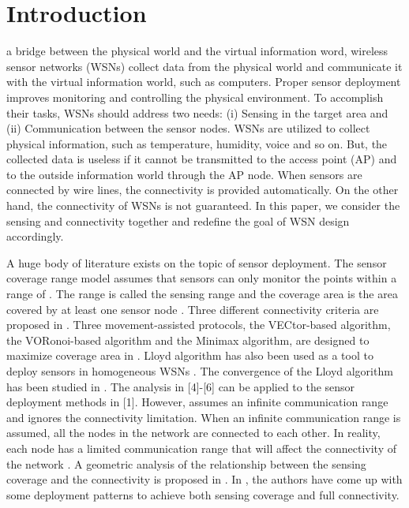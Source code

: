 \documentclass[journal,draftcls,onecolumn,12pt,twoside, narroweqnarray]{IEEEtran}
\begin{document}
\IEEEpeerreviewmaketitle



\section{Introduction}
 a bridge between the physical world and the virtual information word, wireless sensor networks (WSNs) collect data from the physical world and communicate it with the virtual information world, such as computers. Proper sensor deployment improves monitoring and controlling the physical environment.
To accomplish their tasks, WSNs should address two needs: (i) Sensing in the target area and (ii) Communication between the sensor nodes.
WSNs are utilized to collect physical information, such as temperature, humidity, voice and so on. But, the collected data is useless if it cannot be transmitted to the access point (AP) and to the outside information world through the AP node. When sensors are connected by wire lines, the  connectivity is provided automatically.
On the other hand, the connectivity of WSNs is not guaranteed. In this paper, we consider the sensing and connectivity together and redefine the goal of WSN design accordingly.

A huge body of literature exists on the topic of sensor deployment. The sensor coverage range model assumes that sensors can only monitor the points within a range of . The range  is called the sensing range and the coverage area is the area covered by at least one sensor node \cite{SD}. Three different connectivity criteria are proposed in \cite{CC}. Three movement-assisted protocols, the VECtor-based algorithm, the VORonoi-based algorithm and the Minimax algorithm, are designed to maximize coverage area in \cite{wang1}. Lloyd algorithm has also been used as a tool to deploy sensors in homogeneous WSNs \cite{SD}. The convergence of the Lloyd algorithm has been studied in \cite{kiefferconvergence,wuconvergence,qdu1}. The analysis in [4]-[6] can be applied to the sensor deployment methods in [1].
However, \cite{SD} assumes an infinite communication range and ignores the connectivity limitation. When an infinite communication range is assumed, all the nodes in the network are connected to each other. In reality, each node has a limited communication range that will affect the connectivity of the network \cite{hu1,yousefizadeh1}. A geometric analysis of the relationship between the sensing coverage and the connectivity is proposed in \cite{ICC}. In \cite{DCC}, the authors have come up with some deployment patterns to achieve both sensing coverage and full connectivity.
\end{document}
